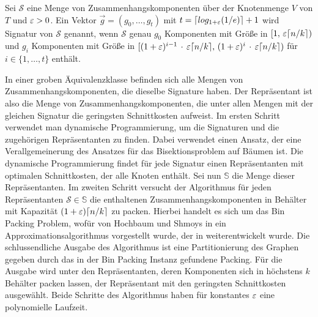 \begin{defn}[Signatur] \label{defn:signature}
    Sei $\mathcal{S}$ eine Menge von Zusammenhangskomponenten über der Knotenmenge $V$ von $T$ und $\eps > 0$. Ein Vektor $\vec{g} = (g_0, \ldots, g_t)$ mit $t = \ceil*{log_{1+\eps}(1/e)} + 1$ wird Signatur von $\mathcal{S}$ genannt, wenn $\mathcal{S}$ genau $g_0$ Komponenten mit Größe in $[1,\, \eps \ceil*{n/k})$ und $g_i$ Komponenten mit Größe in $[(1+\eps)^{i-1}\, \cdot\, \eps \ceil*{n/k},\, (1+\eps)^i\, \cdot \, \eps \ceil*{n/k})$ für $i \in \{1, \ldots, t\}$ enthält.
\end{defn}

In einer groben Äquivalenzklasse befinden sich alle Mengen von Zusammenhangskomponenten, die dieselbe Signature haben.
Der Repräsentant ist also die Menge von Zusammenhangskomponenten, die unter allen Mengen mit der gleichen Signatur die geringsten Schnittkosten aufweist.
Im ersten Schritt verwendet man dynamische Programmierung, um die Signaturen und die zugehörigen Repräsentanten zu finden.
Dabei verwendet einen Ansatz, der eine Verallgemeinerung des Ansatzes für das Bisektionsproblem auf Bäumen ist. \parencite{mcg78, ws11}
Die dynamische Programmierung findet für jede Signatur einen Repräsentanten mit optimalen Schnittkosten, der alle Knoten enthält.
Sei nun $\mathbb{S}$ die Menge dieser Repräsentanten.
Im zweiten Schritt versucht der Algorithmus für jeden Repräsentanten $\mathcal{S} \in \mathbb{S}$ die enthaltenen Zusammenhangskomponenten in Behälter mit Kapazität $(1+\eps)\ceil*{n/k}$ zu packen. 
Hierbei handelt es sich um das Bin Packing Problem, wofür von Hochbaum und Shmoys in \parencite{hs86} ein Approximationsalgorithmus vorgestellt wurde, der in \parencite{va13} weiterentwickelt wurde.
Die schlussendliche Ausgabe des Algorithmus ist eine Partitionierung des Graphen gegeben durch das in der Bin Packing Instanz gefundene Packing.
Für die Ausgabe wird unter den Repräsentanten, deren Komponenten sich in höchstens $k$ Behälter packen lassen, der Repräsentant mit den geringsten Schnittkosten ausgewählt.
Beide Schritte des Algorithmus haben für konstantes $\eps$ eine polynomielle Laufzeit.

